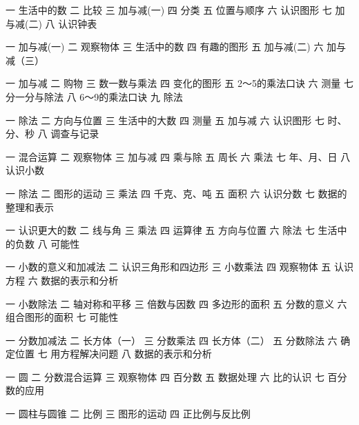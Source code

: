 一 生活中的数
二 比较
三 加与减(一)
四 分类
五 位置与顺序
六 认识图形
七 加与减(二)
八 认识钟表

一 加与减(一)
二 观察物体
三 生活中的数
四 有趣的图形
五 加与减(二)
六 加与减（三）


一 加与减
二 购物
三 数一数与乘法
四 变化的图形
五 2～5的乘法口诀
六 测量
七 分一分与除法
八 6～9的乘法口诀
九 除法

一 除法
二 方向与位置
三 生活中的大数
四 测量
五 加与减
六 认识图形
七 时、分、秒
八 调查与记录

一 混合运算
二 观察物体
三 加与减
四 乘与除
五 周长
六 乘法
七 年、月、日
八 认识小数

一 除法
二 图形的运动
三 乘法
四 千克、克、吨
五 面积
六 认识分数
七 数据的整理和表示

一 认识更大的数
二 线与角
三 乘法
四 运算律
五 方向与位置
六 除法
七 生活中的负数
八 可能性

一 小数的意义和加减法
二 认识三角形和四边形
三 小数乘法
四 观察物体
五 认识方程
六 数据的表示和分析

一 小数除法
二 轴对称和平移
三 倍数与因数
四 多边形的面积
五 分数的意义
六 组合图形的面积
七 可能性

一 分数加减法
二 长方体（一）
三 分数乘法
四 长方体（二）
五 分数除法
六 确定位置
七 用方程解决问题
八 数据的表示和分析


一 圆
二 分数混合运算
三 观察物体
四 百分数
五 数据处理
六 比的认识
七 百分数的应用

一 圆柱与圆锥
二 比例
三 图形的运动
四 正比例与反比例

